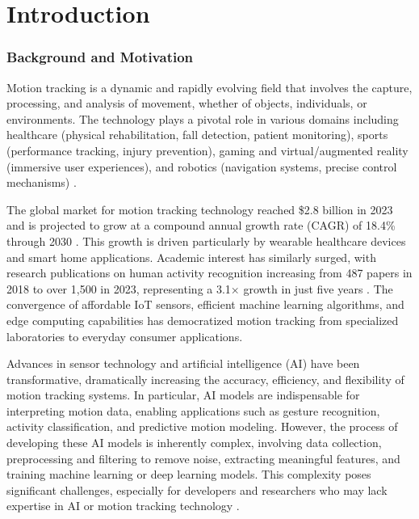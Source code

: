 \chapter{Introduction}
\label{chap:introduction}

\subsection{Background and Motivation}

Motion tracking is a dynamic and rapidly evolving field that involves the capture, processing, and analysis of movement, whether of objects, individuals, or environments. The technology plays a pivotal role in various domains including healthcare (physical rehabilitation, fall detection, patient monitoring), sports (performance tracking, injury prevention), gaming and virtual/augmented reality (immersive user experiences), and robotics (navigation systems, precise control mechanisms) \cite{article:human_motion_tracking_survey}.

The global market for motion tracking technology reached \$2.8 billion in 2023 and is projected to grow at a compound annual growth rate (CAGR) of 18.4\% through 2030 \cite{marketreport2023motion}. This growth is driven particularly by wearable healthcare devices and smart home applications. Academic interest has similarly surged, with research publications on human activity recognition increasing from 487 papers in 2018 to over 1,500 in 2023, representing a 3.1× growth in just five years \cite{wang2024har_comparative}. The convergence of affordable IoT sensors, efficient machine learning algorithms, and edge computing capabilities has democratized motion tracking from specialized laboratories to everyday consumer applications.

Advances in sensor technology and artificial intelligence (AI) have been transformative, dramatically increasing the accuracy, efficiency, and flexibility of motion tracking systems. In particular, AI models are indispensable for interpreting motion data, enabling applications such as gesture recognition, activity classification, and predictive motion modeling. However, the process of developing these AI models is inherently complex, involving data collection, preprocessing and filtering to remove noise, extracting meaningful features, and training machine learning or deep learning models. This complexity poses significant challenges, especially for developers and researchers who may lack expertise in AI or motion tracking technology \cite{article:motion_tracking_using_AI}.

